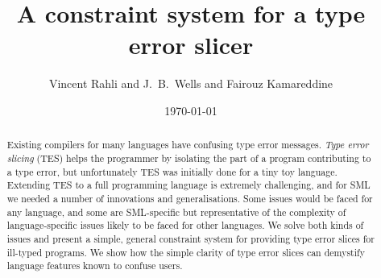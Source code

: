 \documentclass{jfp1}
\begin{document}
\title{A constraint system for a type error slicer}
\author{Vincent Rahli and J.\ B.\ Wells and Fairouz Kamareddine}
\date{\today}
\maketitle



\begin{abstract}
 Existing compilers for many languages have confusing type error
 messages.
 \emph{Type error slicing} (TES) helps the programmer by
 isolating the part of a program contributing to a type error, but
 unfortunately TES was initially done for a tiny toy language.
 Extending TES to a full programming language is extremely
 challenging, and for SML we needed a number of innovations and
 generalisations.
 Some issues would be faced for any language, and some are
 SML-specific but representative of the complexity of
 language-specific issues likely to be faced for other languages.
 We solve both kinds of issues and present a simple, general
 constraint system for providing type error slices for ill-typed
 programs.
 We show how the simple clarity of type error slices can
 demystify language features known to confuse users.

\end{abstract}
\end{document}
